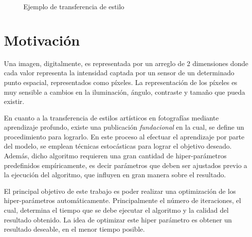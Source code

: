 \documentclass[a4paper,11pt,spanish]{book}
\begin{document}
\begin{figure}[h]
\begin{center}
	
      \end{center}
      \caption{Ejemplo de transferencia de estilo}
      \label{fig:style_transfer_candy_tower}
    \end{figure}
  
  \section {Motivación}
    Una imagen, digitalmente, es representada por un arreglo de 2 dimensiones donde cada valor representa la intensidad captada por un sensor
    de un determinado punto espacial, representados como píxeles. 
    La representación de los píxeles es muy sensible a cambios en la iluminación, ángulo, contraste y tamaño que pueda existir.

    En cuanto a la transferencia de estilos artísticos en fotografías mediante aprendizaje profundo, existe una publicación \emph{fundacional} \cite{Gatys:Neural_Style} 
    en la cual, se define un procedimiento para lograrlo. 
    En este proceso al efectuar el aprendizaje por parte del modelo, se emplean técnicas estocásticas para lograr el objetivo deseado. 
    Además, dicho algoritmo requieren una gran cantidad de hiper-parámetros predefinidos empíricamente, es decir parámetros que deben ser ajustados previo a la ejecución 
    del algoritmo, que influyen en gran manera sobre el resultado.

    El principal objetivo de este trabajo es poder realizar una optimización de los hiper-parámetros automáticamente. 
    Principalmente el número de iteraciones, el cual, determina el tiempo que se debe ejecutar el algoritmo y la calidad del resultado obtenido. 
    La idea de optimizar este hiper parámetro es obtener un resultado deseable, en el menor tiempo posible.
\end{document}
